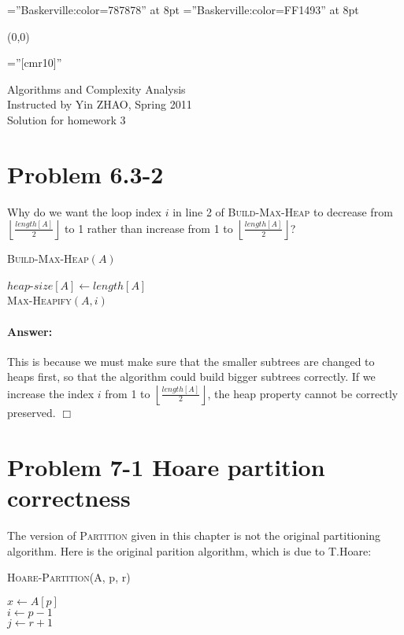 \documentclass[a4paper,10pt]{article}
\newcommand{\problem}[1]{\section*{Problem #1}}
\newcommand{\answer}{\paragraph{Answer:}}
\newcommand{\qed}{\hfill \ensuremath{\Box}}
\begin{document}
\font\wm=''Baskerville:color=787878'' at 8pt
\font\wmtoday=''Baskerville:color=FF1493'' at 8pt
{\wm 
	\begin{textblock}{1}(0,0)
	\end{textblock}
}

\pagestyle{empty} %

\font\fb=''[cmr10]'' %

\par{\centering
  {\Large Algorithms and Complexity Analysis}
  \\
  { Instructed by Yin ZHAO, Spring 2011}
  \\
		{\Huge Solution for homework 3
	}\bigskip\par}


\problem{6.3-2}
Why do we want the loop index $i$ in line 2 of \textsc{Build-Max-Heap} to decrease from 
$\left\lfloor \frac{length[A]}{2}\right\rfloor$ to 1 rather than increase from 1
to $\left\lfloor \frac{length[A]}{2}\right\rfloor$?

\begin{algorithm}[H]
\caption{\textsc{Build-Max-Heap}$(A)$}
$heap$-$size[A]\leftarrow length[A]$\\
 {
  \textsc{Max-Heapify}$(A, i)$
}
\end{algorithm}

\answer

This is because we must make sure that the smaller subtrees are changed to heaps first, so that the
algorithm could build bigger subtrees correctly. If we increase the index $i$ from 1 to
$\left\lfloor\frac{length[A]}{2}\right\rfloor$, the heap property cannot be correctly preserved.
\qed

\problem{7-1 Hoare partition correctness}
The version of \textsc{Partition} given in this chapter is not the original partitioning algorithm. 
Here is the original parition algorithm, which is due to T.Hoare:

\begin{algorithm}[H]
\caption{\textsc{Hoare-Partition}(A, p, r)}
$x \leftarrow A[p]$\\
$i \leftarrow p - 1$\\
$j \leftarrow r + 1$\\
\end{algorithm}
\end{document}

